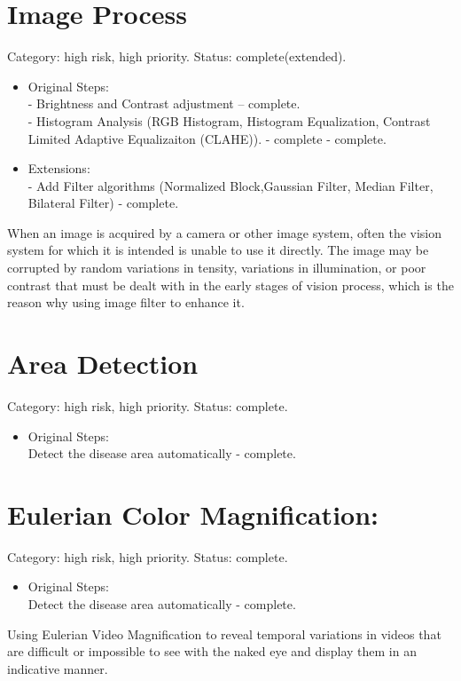 \section{Image Process}
Category: high risk, high priority. Status: complete(extended).
\begin{itemize}
\item{Original Steps:}\\
- Brightness and Contrast adjustment – complete.\\
- Histogram Analysis (RGB  Histogram,  Histogram Equalization,   Contrast   Limited   Adaptive   Equalizaiton (CLAHE)). - complete - complete.
\item{Extensions:}\\
- Add Filter algorithms (Normalized  Block,Gaussian Filter, Median Filter, Bilateral Filter) - complete. \\
\end{itemize}
When an image is acquired by a camera or other image system, often the vision system for which it is intended is unable to use it directly. The image may be corrupted by random variations in tensity, variations in illumination, or poor contrast that must be dealt with in the early stages of vision process, which is the reason why using image filter to enhance it.

\section{Area Detection}
Category: high risk, high priority. Status: complete.
\begin{itemize}
\item{Original Steps:}\\
Detect the disease area automatically - complete.
\end{itemize}

\section{Eulerian Color Magnification:}
Category: high risk, high priority. Status: complete.
\begin{itemize}
\item{Original Steps:}\\
Detect the disease area automatically - complete.
\end{itemize}
Using Eulerian Video Magnification to reveal temporal variations in videos that are difficult or impossible to see with the naked eye and display them in an indicative manner.
